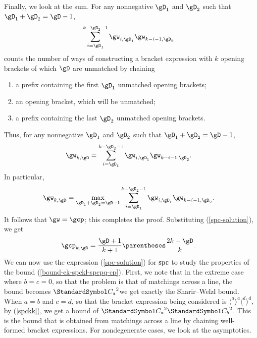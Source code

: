 Finally, we look at the sum. For any nonnegative $\gD_1$ and $\gD_2$ such that $\gD_1+\gD_2=\gD-1$,\[
\sum{i=\gD_1}[k-\gD_2-1]\gw_{i,\gD_1}\gw_{k-i-1,\gD_2}
\]
counts the number of ways of constructing a bracket expression with $k$ opening brackets of which $\gD$ are unmatched
by chaining
\begin{enumerate}
\item a prefix containing the first $\gD_1$ unmatched opening brackets;
\item an opening bracket, which will be unmatched;
\item a prefix containing the last $\gD_2$ unmatched opening brackets.
\end{enumerate}
Thus, for any nonnegative $\gD_1$ and $\gD_2$ such that $\gD_1+\gD_2=\gD-1$,\[
\gw_{k,\gD}=\sum{i=\gD_1}[k-\gD_2-1]\gw_{i,\gD_1}\gw_{k-i-1,\gD_2}\text.
\]
In particular,\[
\gw_{k,\gD}=\max_{\gD_1+\gD_2=\gD-1}\sum{i=\gD_1}[k-\gD_2-1]\gw_{i,\gD_1}\gw_{k-i-1,\gD_2}\text.
\]
It follows that $\gw=\gcp$; this completes the proof.
Substituting (\ref{spc-solution}), we get\begin{equation}
\gcp_{k,\gD}=\frac{\gD+1}{k+1}\binom{2k-\gD}{k}\text.
\end{equation}
We can now use the expression (\ref{spc-solution}) for $\operatorname{spc}$ to study the properties of the bound
(\ref{bound-ck-spckl-spcpq-cp}).
First, we note that in the extreme case where $b=c=0$, so that the problem is that of matchings across
a line, the bound becomes ${\CatalanNumber a}^2$\idest we get exactly the Sharir--Welzl bound. When $a=b$ and
$c=d$, so that the bracket expression being considered is $\langle^a\rangle^a\langle^d\rangle^d$,
by (\ref{spckk}), we get a bound of ${\CatalanNumber a}^2{\CatalanNumber b}^2$. This is the bound that
is obtained from matchings across a line by chaining well-formed bracket expressions.
For nondegenerate cases, we look at the asymptotics.

